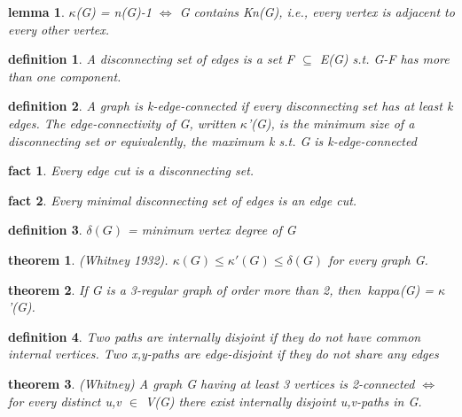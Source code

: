 \documentclass[twocolumn]{article}
\newtheorem{theorem}{theorem}[section]  %
\newtheorem{definition}{definition}
\newtheorem{lemma}{lemma}
\newtheorem{fact}{fact}
\begin{document}
\begin{CJK*}{UTF8}{bkai}
    \begin{lemma}
        $\kappa$(G) = n(G)-1 $\iff$ G contains Kn(G), i.e., every vertex is adjacent to every
 other vertex.
    \end{lemma}

    \begin{definition}
         A disconnecting set of edges is a set F $\subseteq $ E(G) s.t. G-F has more than one
 component.
    \end{definition}

    \begin{definition}
         A graph is k-edge-connected if every disconnecting set has at least k edges.
 The edge-connectivity of G, written $
 \kappa$'(G), is the minimum size of a
 disconnecting set or equivalently, the maximum k s.t. G is k-edge-connected
    \end{definition}

    \begin{fact}
    Every edge cut is a disconnecting set.
    \end{fact}

    \begin{fact}
         Every minimal disconnecting set of edges is an edge cut.
    \end{fact}

    \begin{definition}
        $\delta (G)$ = minimum vertex degree of G
    \end{definition}

    \begin{theorem}{ (Whitney 1932).}
         $\kappa (G) \leq \kappa '(G) \leq \delta (G)$ for every graph G.
    \end{theorem}

    \begin{theorem}
         If G is a 3-regular graph of order more than 2, then $\
         kappa $(G) = $\kappa $'(G).
    \end{theorem}

    \begin{definition}
         Two paths are internally disjoint if they do not have common internal vertices.
         Two x,y-paths are edge-disjoint if they do not share any edges
        \end{definition}

    \begin{theorem}{(Whitney)}
         A graph G having at least 3 vertices is 2-connected $\iff$ for every distinct
 u,v $\in$ V(G) there exist internally disjoint u,v-paths in G.
    \end{theorem}


\end{CJK*}
\end{document}
